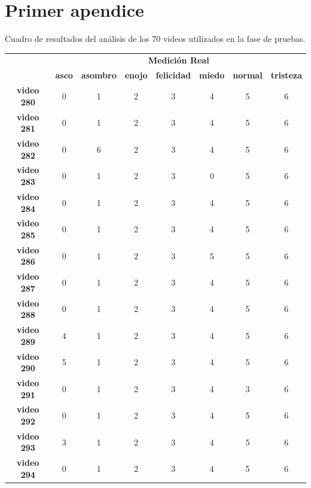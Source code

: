 \appendix
\chapter{Primer apendice}
Cuadro de resultados del análisis de los 70 videos utilizados en la fase de pruebas.

\begin{table}[]
\centering
\begin{tabular}{c|c|c|c|c|c|c|c|}
\cline{2-8}
\multicolumn{1}{l|}{} & \multicolumn{7}{c|}{\bf Medición Real}                                                                                            \\ \cline{2-8} 
\multicolumn{1}{l|}{} & \textbf{asco} & \textbf{asombro} & \textbf{enojo} & \textbf{felicidad} & \textbf{miedo} & \textbf{normal} & \textbf{tristeza} \\ \hline
\multicolumn{1}{|c|}{\textbf{video 280}} & 0 & 1 & 2 & 3 & 4 & 5 & 6 \\ \hline
\multicolumn{1}{|c|}{\textbf{video 281}} & 0 & 1 & 2 & 3 & 4 & 5 & 6 \\ \hline
\multicolumn{1}{|c|}{\textbf{video 282}} & 0 & 6 & 2 & 3 & 4 & 5 & 6 \\ \hline
\multicolumn{1}{|c|}{\textbf{video 283}} & 0 & 1 & 2 & 3 & 0 & 5 & 6 \\ \hline
\multicolumn{1}{|c|}{\textbf{video 284}} & 0 & 1 & 2 & 3 & 4 & 5 & 6 \\ \hline
\multicolumn{1}{|c|}{\textbf{video 285}} & 0 & 1 & 2 & 3 & 4 & 5 & 6 \\ \hline
\multicolumn{1}{|c|}{\textbf{video 286}} & 0 & 1 & 2 & 3 & 5 & 5 & 6 \\ \hline
\multicolumn{1}{|c|}{\textbf{video 287}} & 0 & 1 & 2 & 3 & 4 & 5 & 6 \\ \hline
\multicolumn{1}{|c|}{\textbf{video 288}} & 0 & 1 & 2 & 3 & 4 & 5 & 6 \\ \hline
\multicolumn{1}{|c|}{\textbf{video 289}} & 4 & 1 & 2 & 3 & 4 & 5 & 6 \\ \hline
\multicolumn{1}{|c|}{\textbf{video 290}} & 5 & 1 & 2 & 3 & 4 & 5 & 6 \\ \hline
\multicolumn{1}{|c|}{\textbf{video 291}} & 0 & 1 & 2 & 3 & 4 & 3 & 6 \\ \hline
\multicolumn{1}{|c|}{\textbf{video 292}} & 0 & 1 & 2 & 3 & 4 & 5 & 6 \\ \hline
\multicolumn{1}{|c|}{\textbf{video 293}} & 3 & 1 & 2 & 3 & 4 & 5 & 6 \\ \hline
\multicolumn{1}{|c|}{\textbf{video 294}} & 0 & 1 & 2 & 3 & 4 & 5 & 6 \\ \hline

\end{tabular}
\end{table}
